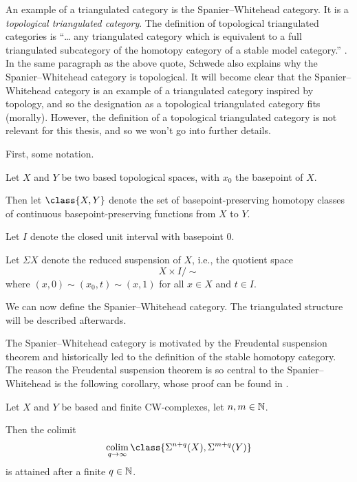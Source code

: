 An example of a triangulated category is the Spanier--Whitehead category. It is a \emph{topological triangulated category}. The definition of topological triangulated categories is ``… any triangulated category which is equivalent to a full triangulated subcategory of the homotopy category of a stable model category.'' \cite[At the top of p. 6 in the standalone article]{Schwede_2010}. In the same paragraph as the above quote, Schwede also explains why the Spanier--Whitehead category is topological. It will become clear that the Spanier--Whitehead category is an example of a triangulated category inspired by topology, and so the designation as a topological triangulated category fits (morally). However, the definition of a topological triangulated category is not relevant for this thesis, and so we won't go into further details. 

First, some notation.
\begin{notation}
    Let \( X \) and \( Y \) be two based topological spaces, with \(x_0 \) the basepoint of \( X \).

    Then let \( \class{ X, Y } \) denote the set of basepoint-preserving homotopy classes of continuous basepoint-preserving functions from \( X \) to \( Y \).

    Let \( I \) denote the closed unit interval with basepoint \( 0 \).

    Let \( \Sigma X \) denote the reduced suspension of \( X \), i.e., the quotient space
    \[
        X \times I / \sim
    \]
    where \( (x, 0) \sim (x_0, t) \sim (x, 1) \) for all \( x \in X \)  and \( t \in I \).
\end{notation}

We can now define the Spanier--Whitehead category. The triangulated structure will be described afterwards.

The Spanier--Whitehead category is motivated by the Freudental suspension theorem and historically led to the definition of the stable homotopy category. The reason the Freudental suspension theorem is so central to the Spanier--Whitehead is the following corollary, whose proof can be found in \cite[Remark 5.2]{Daria_Bachelor}.

\begin{corollary}
    \label{cor:sw_freudenthal_suspension}
    Let \( X \) and \( Y \) be based and finite CW-complexes, let \( n, m \in {\mathbb{N}} \).
    
    Then the colimit
    \[
        \colim_{q \to \infty} \class{ \Sigma^{n + q}(X), \Sigma^{m + q}(Y) }
    \]
    is attained after a finite \( q \in {\mathbb{N}} \).
\end{corollary}

